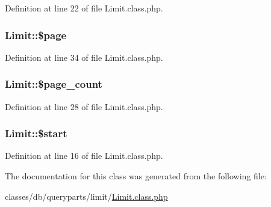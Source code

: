 Definition at line 22 of file Limit.\-class.\-php.

\hypertarget{classLimit_a4018b14c795cefed6f16b6651ca343dc}{
\subsubsection[{\$page}]{\setlength{\rightskip}{0pt plus 5cm}Limit\-::\$page}}\label{classLimit_a4018b14c795cefed6f16b6651ca343dc}


Definition at line 34 of file Limit.\-class.\-php.

\hypertarget{classLimit_a4e9d12866f8d59589273aaf8e50eaccd}{
\subsubsection[{\$page\-\_\-count}]{\setlength{\rightskip}{0pt plus 5cm}Limit\-::\$page\-\_\-count}}\label{classLimit_a4e9d12866f8d59589273aaf8e50eaccd}


Definition at line 28 of file Limit.\-class.\-php.

\hypertarget{classLimit_a58e5f9abf39a412a992c922b3342d093}{
\subsubsection[{\$start}]{\setlength{\rightskip}{0pt plus 5cm}Limit\-::\$start}}\label{classLimit_a58e5f9abf39a412a992c922b3342d093}


Definition at line 16 of file Limit.\-class.\-php.



The documentation for this class was generated from the following file\-:\begin{DoxyCompactItemize}
\item 
classes/db/queryparts/limit/\hyperlink{Limit_8class_8php}{Limit.\-class.\-php}\end{DoxyCompactItemize}
